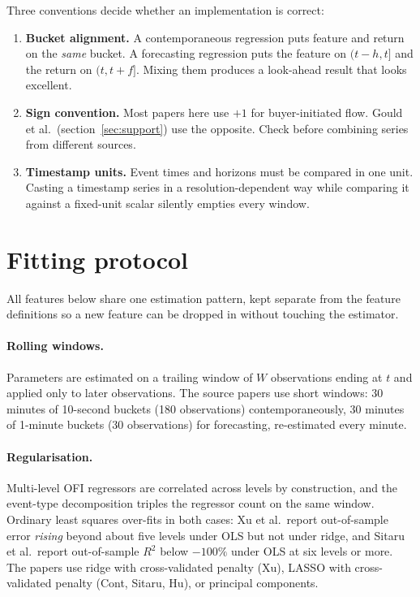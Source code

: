 \documentclass[11pt]{article}
\begin{document}
Three conventions decide whether an implementation is correct:

\begin{enumerate}[leftmargin=2em,itemsep=2pt]
\item \textbf{Bucket alignment.} A contemporaneous regression puts feature and
return on the \emph{same} bucket. A forecasting regression puts the feature on
$(t-h,t]$ and the return on $(t,t+f]$. Mixing them produces a look-ahead result
that looks excellent.
\item \textbf{Sign convention.} Most papers here use $+1$ for buyer-initiated
flow. Gould et al.\ (section~\ref{sec:support}) use the opposite. Check before
combining series from different sources.
\item \textbf{Timestamp units.} Event times and horizons must be compared in one
unit. Casting a timestamp series in a resolution-dependent way while comparing
it against a fixed-unit scalar silently empties every window.
\end{enumerate}

\section{Fitting protocol}\label{sec:protocol}

All features below share one estimation pattern, kept separate from the feature
definitions so a new feature can be dropped in without touching the estimator.

\paragraph{Rolling windows.} Parameters are estimated on a trailing window of
$W$ observations ending at $t$ and applied only to later observations. The
source papers use short windows: 30 minutes of 10-second buckets (180
observations) contemporaneously, 30 minutes of 1-minute buckets (30
observations) for forecasting, re-estimated every minute.

\paragraph{Regularisation.} Multi-level OFI regressors are correlated across
levels by construction, and the event-type decomposition triples the regressor
count on the same window. Ordinary least squares over-fits in both cases: Xu et
al.\ report out-of-sample error \emph{rising} beyond about five levels under
OLS but not under ridge, and Sitaru et al.\ report out-of-sample $R^2$ below
$-100\%$ under OLS at six levels or more. The papers use ridge with
cross-validated penalty (Xu), LASSO with cross-validated penalty (Cont,
Sitaru, Hu), or principal components.
\end{document}
